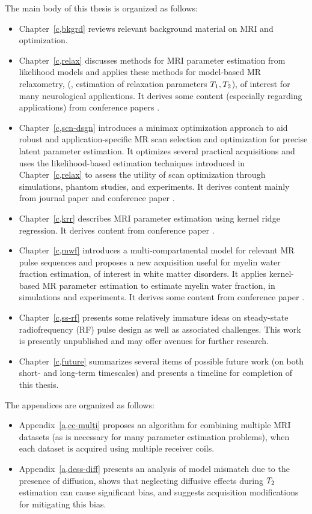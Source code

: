 The main body of this thesis is organized as follows:
\begin{itemize}
\item 
	Chapter~\ref{c,bkgrd} reviews 
	relevant background material
	on MRI and optimization.
\item 
	Chapter~\ref{c,relax} discusses methods 
	for MRI parameter estimation 
	from likelihood models 
	and applies these methods 
	for model-based MR relaxometry, 
	(\ie, estimation of relaxation parameters $T_1,T_2$),
	of interest for many neurological applications.
	It derives some content 
	(especially regarding applications)
	from conference papers 
	\cite{nataraj:14:rje,nataraj:14:mbe}.
\item
	Chapter~\ref{c,scn-dsgn} introduces
	a minimax optimization approach
	to aid robust and application-specific 
	MR scan selection and optimization 
	for precise latent parameter estimation.
	It optimizes several practical acquisitions 
	and uses the likelihood-based estimation techniques 
	introduced in Chapter~\ref{c,relax}
	to assess the utility
	of scan optimization
	through simulations, 
	phantom studies, 
	and \invivo experiments.
	It derives content
	mainly from journal paper
	\cite{nataraj::oms}
	and conference paper
	\cite{nataraj:15:amm}.
\item 
	Chapter~\ref{c,krr} describes 
	MRI parameter estimation
	using kernel ridge regression.
	It derives content 
	from conference paper
	\cite{nataraj:17:dfm}.
\item
	Chapter~\ref{c,mwf} introduces a multi-compartmental model
	for relevant MR pulse sequences
	and proposes a new acquisition 
	useful for myelin water fraction estimation,
	of interest in white matter disorders.
	It applies kernel-based MR parameter estimation
	to estimate myelin water fraction,
	in simulations and \invivo experiments.
	It derives some content from conference paper
	\cite{nataraj:17:mwf}.
\item
	Chapter~\ref{c,ss-rf} presents
	some relatively immature ideas
	on steady-state radiofrequency (RF) pulse design
	as well as associated challenges.
	This work is presently unpublished
	and may offer avenues for further research.
\item 
	Chapter~\ref{c,future} summarizes several items 
	of possible future work
	(on both short- and long-term timescales) 
	and presents a timeline
	for completion of this thesis.
\end{itemize}

The appendices are organized as follows:
\begin{itemize}
\item
	Appendix~\ref{a,cc-multi} proposes an algorithm
	for combining multiple MRI datasets
	(as is necessary for many parameter estimation problems),
	when each dataset is acquired 
	using multiple receiver coils.
\item
	Appendix~\ref{a,dess-diff} presents an analysis
	of model mismatch due to the presence of diffusion,
	shows that neglecting diffusive effects
	during $T_2$ estimation 
	can cause significant bias,
	and suggests acquisition modifications
	for mitigating this bias.
\end{itemize}

